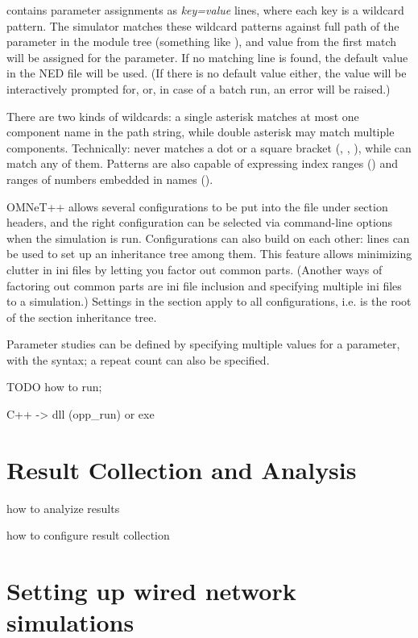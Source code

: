  contains parameter assignments as \textit{key=value}
lines, where each key is a wildcard pattern. The simulator matches these
wildcard patterns against full path of the parameter in the module tree
(something like ), and value from
the first match will be assigned for the parameter. If no matching line is
found, the default value in the NED file will be used. (If there is no
default value either, the value will be interactively prompted for, or, in
case of a batch run, an error will be raised.)

There are two kinds of wildcards: a single asterisk \ttt{*} matches at most
one component name in the path string, while double asterisk \ttt{**} may
match multiple components. Technically: \ttt{*} never matches a dot or a
square bracket (, \ttt{[}, \ttt{]}), while \ttt{**} can match any of
them. Patterns are also capable of expressing index ranges
() and ranges of numbers embedded
in names ().

OMNeT++ allows several configurations to be put into the 
file under  section headers, and the right
configuration can be selected via command-line options when the simulation
is run. Configurations can also build on each other: 
lines can be used to set up an inheritance tree among them. This feature
allows minimizing clutter in ini files by letting you factor out common
parts. (Another ways of factoring out common parts are ini file inclusion
and specifying multiple ini files to a simulation.) Settings in the
\ttt{[General]} section apply to all configurations, i.e. \ttt{[General]}
is the root of the section inheritance tree.

Parameter studies can be defined by specifying multiple values for a
parameter, with the  syntax;
a repeat count can also be specified.

\ifdraft TODO
how to run;

C++ -> dll (opp\_run) or exe
\fi

\section{Result Collection and Analysis}

how to analyize results

how to configure result collection


\section{Setting up wired network simulations}

